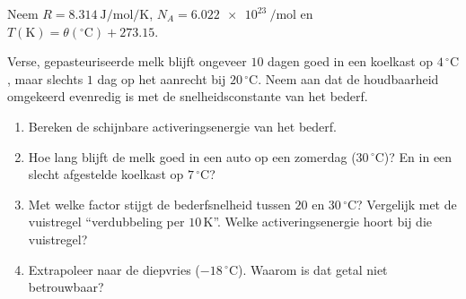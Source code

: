 
Neem $R = \SI{8.314}{\joule\per\mole\per\kelvin}$, $N_A = \SI{6.022e23}{\per\mole}$ en $T(\mathrm{K}) = \theta(^\circ\mathrm{C}) + 273.15$.

\begin{oefening}
Verse, gepasteuriseerde melk blijft ongeveer \(10\) dagen goed in een koelkast op \(4\,^\circ\mathrm{C}\), maar slechts \(1\) dag op het aanrecht bij \(20\,^\circ\mathrm{C}\). Neem aan dat de houdbaarheid omgekeerd evenredig is met de snelheidsconstante van het bederf.

\begin{enumerate}
\item[(a)]
  Bereken de schijnbare activeringsenergie van het bederf.
\item[(b)]
  Hoe lang blijft de melk goed in een auto op een zomerdag (\(30\,^\circ\mathrm{C}\))? En in een slecht afgestelde koelkast op \(7\,^\circ\mathrm{C}\)?
\item[(c)]
  Met welke factor stijgt de bederfsnelheid tussen \(20\) en \(30\,^\circ\mathrm{C}\)? Vergelijk met de vuistregel ``verdubbeling per \(10\,\mathrm{K}\)''. Welke activeringsenergie hoort bij die vuistregel?
\item[(d)]
  Extrapoleer naar de diepvries (\(-18\,^\circ\mathrm{C}\)). Waarom is dat getal niet betrouwbaar?
\end{enumerate}
\end{oefening}
